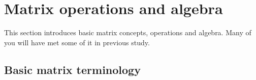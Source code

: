 
\section{Matrix operations and algebra}
\label{sec:moaa}
\secttoc

This section introduces basic matrix concepts, operations and algebra.
Many of you will have met some of it in previous study.


\subsection{Basic matrix terminology}
\label{sec:bmt}

